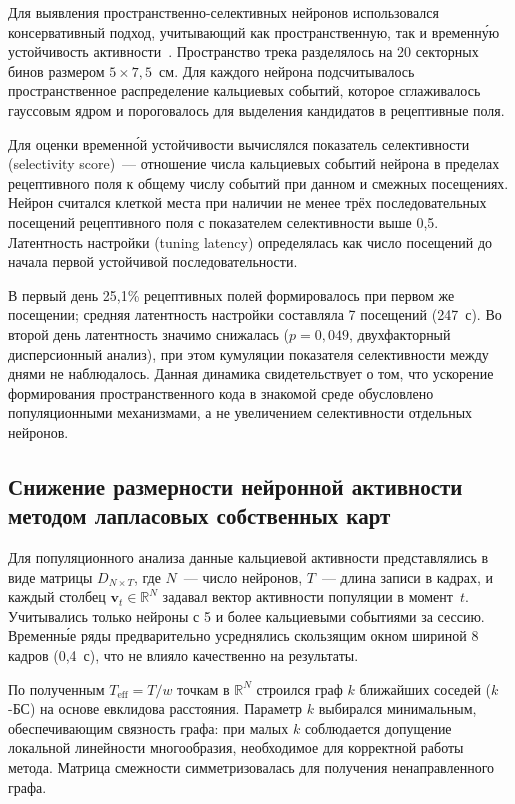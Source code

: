 Для выявления пространственно-селективных нейронов использовался консервативный подход, учитывающий как пространственную, так и временн\'{у}ю устойчивость активности~\cite{Sotskov2022}. Пространство трека разделялось на 20 секторных бинов размером $5 \times 7{,}5$~см. Для каждого нейрона подсчитывалось пространственное распределение кальциевых событий, которое сглаживалось гауссовым ядром и пороговалось для выделения кандидатов в рецептивные поля.

Для оценки временн\'{о}й устойчивости вычислялся показатель селективности (selectivity score)~--- отношение числа кальциевых событий нейрона в пределах рецептивного поля к общему числу событий при данном и смежных посещениях. Нейрон считался клеткой места при наличии не менее трёх последовательных посещений рецептивного поля с показателем селективности выше 0{,}5. Латентность настройки (tuning latency) определялась как число посещений до начала первой устойчивой последовательности.

В первый день 25{,}1\% рецептивных полей формировалось при первом же посещении; средняя латентность настройки составляла 7 посещений (247~с). Во второй день латентность значимо снижалась ($p = 0{,}049$, двухфакторный дисперсионный анализ), при этом кумуляции показателя селективности между днями не наблюдалось. Данная динамика свидетельствует о том, что ускорение формирования пространственного кода в знакомой среде обусловлено популяционными механизмами, а не увеличением селективности отдельных нейронов.

\subsection{Снижение размерности нейронной активности методом лапласовых собственных карт}

Для популяционного анализа данные кальциевой активности представлялись в виде матрицы $D_{N \times T}$, где $N$~--- число нейронов, $T$~--- длина записи в кадрах, и каждый столбец $\mathbf{v}_t \in \mathbb{R}^N$ задавал вектор активности популяции в момент~$t$. Учитывались только нейроны с 5 и более кальциевыми событиями за сессию. Временн\'{ы}е ряды предварительно усреднялись скользящим окном шириной 8 кадров (0{,}4~с), что не влияло качественно на результаты.

По полученным $T_{\text{eff}} = T/w$ точкам в $\mathbb{R}^N$ строился граф $k$ ближайших соседей ($k$-БС) на основе евклидова расстояния. Параметр $k$ выбирался минимальным, обеспечивающим связность графа: при малых $k$ соблюдается допущение локальной линейности многообразия, необходимое для корректной работы метода. Матрица смежности симметризовалась для получения ненаправленного графа.

